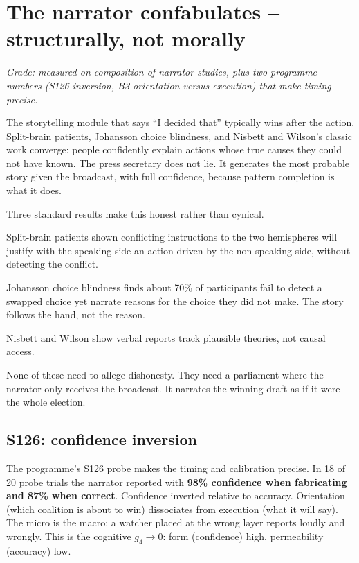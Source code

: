 \section{The narrator confabulates -- structurally, not morally}

\textit{Grade: measured on composition of narrator studies, plus two programme numbers (S126 inversion, B3 orientation versus execution) that make timing precise.}

The storytelling module that says ``I decided that'' typically wins after the action. Split-brain patients, Johansson choice blindness, and Nisbett and Wilson's classic work converge: people confidently explain actions whose true causes they could not have known. The press secretary does not lie. It generates the most probable story given the broadcast, with full confidence, because pattern completion is what it does.

Three standard results make this honest rather than cynical.

Split-brain patients shown conflicting instructions to the two hemispheres will justify with the speaking side an action driven by the non-speaking side, without detecting the conflict.

Johansson choice blindness finds about 70\% of participants fail to detect a swapped choice yet narrate reasons for the choice they did not make. The story follows the hand, not the reason.

Nisbett and Wilson show verbal reports track plausible theories, not causal access.

None of these need to allege dishonesty. They need a parliament where the narrator only receives the broadcast. It narrates the winning draft as if it were the whole election.

\subsection{S126: confidence inversion}

The programme's S126 probe makes the timing and calibration precise. In 18 of 20 probe trials the narrator reported with \textbf{98\% confidence when fabricating and 87\% when correct}. Confidence inverted relative to accuracy. Orientation (which coalition is about to win) dissociates from execution (what it will say). The micro is the macro: a watcher placed at the wrong layer reports loudly and wrongly. This is the cognitive $g_4\to0$: form (confidence) high, permeability (accuracy) low.


